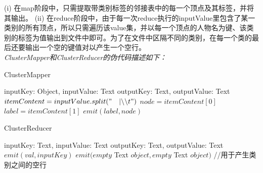 (i) 在map阶段中，只需提取带类别标签的邻接表中的每一个顶点及其标签，并将其输出。
(ii) 在reduce阶段中，由于每一次reduce执行的inputValue里包含了某一类别的所有顶点，所以只需遍历该value集，并以每一个顶点的人物名为键、该类别的标签为值输出到文件中即可。为了在文件中区隔不同的类别，在每一个类的最后还要输出一个空的键值对以产生一个空行。
\\
\emph{ClusterMapper和ClusterReducer的伪代码描述如下：}
\begin{algorithm}[H]
    \caption{ClusterMapper}
    \begin{algorithmic}[1]
        \REQUIRE inputKey: Object, inputValue: Text
        \ENSURE outputKey: Text, outputValue: Text
        \STATE $itemContent = inputValue.split("\quad |\backslash\backslash t")$
        \STATE $node = itemContent[0]$
        \STATE $label = itemContent[1]$
        \STATE $emit(label, node)$
    \end{algorithmic}
\end{algorithm}
\begin{algorithm}[H]
    \caption{ClusterReducer}
    \begin{algorithmic}[1]
        \REQUIRE inputKey: Text, inputValue: Text
        \ENSURE outputKey: Text, outputValue: Text
        \STATE $emit(val, inputKey)$
        \ENDFOR
        \STATE $emit(empty$ Text $object, empty$ Text $object)$ //用于产生类别之间的空行
    \end{algorithmic}
\end{algorithm}